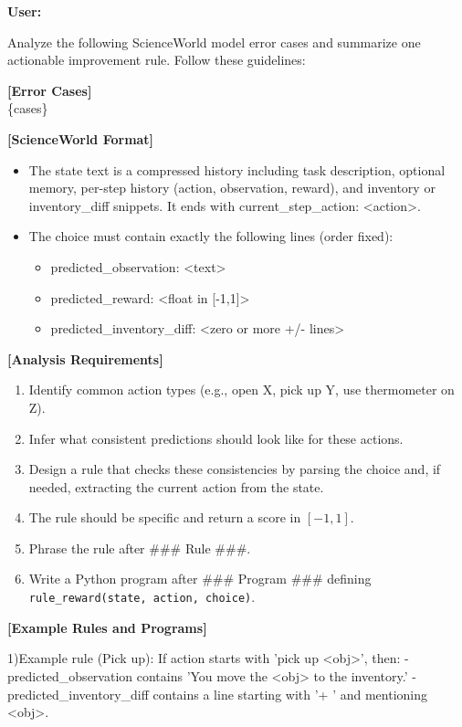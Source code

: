 \documentclass{article}
\theoremstyle{plain}
\theoremstyle{definition}
\theoremstyle{remark}
\begin{document}
\begin{tcolorbox}[
  title=Rule induction for ScienceWorld,
  colback=gray!5,
  colframe=black!50,
  fonttitle=\bfseries,
  breakable
]
\textbf{User:}

Analyze the following ScienceWorld model error cases and summarize one actionable improvement rule. Follow these guidelines:

\textbf{[Error Cases]} \\
\{cases\}

\textbf{[ScienceWorld Format]}
\begin{itemize}
  \item The state text is a compressed history including task description, optional memory, per-step history (action, observation, reward), and inventory or inventory\_diff snippets. It ends with current\_step\_action: <action>.
  \item The choice must contain exactly the following lines (order fixed):
  \begin{itemize}
    \item predicted\_observation: <text>
    \item predicted\_reward: <float in [-1,1]>
    \item predicted\_inventory\_diff: <zero or more +/- lines>
  \end{itemize}
\end{itemize}

\textbf{[Analysis Requirements]}
\begin{enumerate}
  \item Identify common action types (e.g., open X, pick up Y, use thermometer on Z).
  \item Infer what consistent predictions should look like for these actions.
  \item Design a rule that checks these consistencies by parsing the choice and, if needed, extracting the current action from the state.
  \item The rule should be specific and return a score in $[-1,1]$.
  \item Phrase the rule after \#\#\# Rule \#\#\#.
  \item Write a Python program after \#\#\# Program \#\#\# defining \texttt{rule\_reward(state, action, choice)}.
\end{enumerate}

\textbf{[Example Rules and Programs]}

1)Example rule (Pick up): If action starts with 'pick up <obj>', then:
   - predicted\_observation contains 'You move the <obj> to the inventory.'
   - predicted\_inventory\_diff contains a line starting with '+ ' and mentioning <obj>.
   

\end{tcolorbox}
\end{document}
